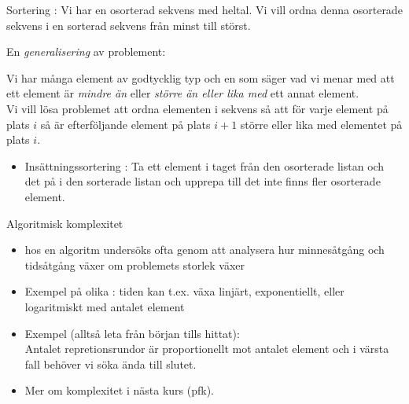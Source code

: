 \begin{Slide}{Sortering}
: Vi har en osorterad sekvens med heltal. Vi vill ordna denna osorterade sekvens i en sorterad sekvens från minst till störst.
\pause

\vspace{1em}\noindent
En \emph{generalisering} av problement: \\ \vspace{1em}

\noindent Vi har många element av godtycklig typ och en  som säger vad vi menar med att ett element är \emph{mindre än} eller \emph{större än eller lika med} ett annat element. \\ 

\vspace{1em}\noindent Vi vill lösa problemet att ordna elementen i sekvens så att för varje element på plats $i$ så är efterföljande element på plats $i + 1$ större eller lika med elementet på plats $i$.


\begin{itemize}
\item Insättningssortering : Ta ett element i taget från den osorterade listan och  det på  i den sorterade listan och upprepa till det inte finns fler osorterade element.
\end{itemize}
\end{Slide}



\begin{Slide}{Algoritmisk komplexitet}
\begin{itemize}
\item {} hos en algoritm undersöks ofta genom att analysera hur minnesåtgång och tidsåtgång växer om problemets storlek växer
\item Exempel på olika : tiden kan t.ex. växa linjärt, exponentiellt, eller logaritmiskt med antalet element
\item Exempel  (alltså leta från början tills hittat): \\ Antalet repretionsrundor är proportionellt mot antalet element och i värsta fall behöver vi söka ända till slutet.
\item Mer om komplexitet i nästa kurs (pfk).
\end{itemize}
\end{Slide}


